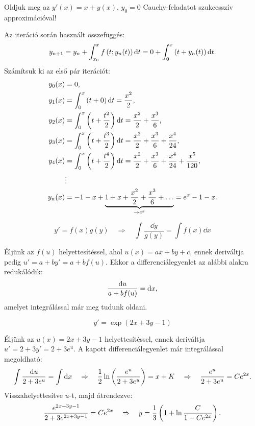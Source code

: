 \documentclass{szb-practice}
\begin{document}
\begin{example}
  Oldjuk meg az $y'(x) = x + y(x)$, $y_0 = 0$ Cauchy-feladatot szukcesszív
  approximációval!

  \boxrule

  Az iteráció során használt összefüggés:
  $$
    y_{n + 1}
    = y_n + \int_{x_0}^x f\left( t; y_{n}(t) \right) \mathop{}\!\mathrm{d} t
    = 0 + \int_0^x \left( t + y_n(t) \right) \mathop{}\!\mathrm{d} t
    \text.
  $$
  Számítsuk ki az első pár iterációt:
  \begin{align*}
    y_0(x)  & = 0 \text,
    \\
    y_1(x)  & = \int_0^x \left( t + 0 \right) \mathop{}\!\mathrm{d} t = \frac{x^2}{2} \text,
    \\
    y_2(x)  & = \int_0^x \left( t + \frac{t^2}{2} \right) \mathop{}\!\mathrm{d} t
    = \frac{x^2}{2} + \frac{x^3}{6} \text,
    \\
    y_3 (x) & = \int_0^x \left( t + \frac{t^3}{2} \right) \mathop{}\!\mathrm{d} t
    = \frac{x^2}{2} + \frac{x^3}{6} + \frac{x^4}{24} \text,
    \\
    y_4(x)  & = \int_0^x \left( t + \frac{t^4}{2} \right) \mathop{}\!\mathrm{d} t
    = \frac{x^2}{2} + \frac{x^3}{6} + \frac{x^4}{24} + \frac{x^5}{120} \text,
    \\
            & \vdots
    \\
    y_n(x)  & = -1 -x + \underbrace{1 + x + \frac{x^2}{2} + \frac{x^3}{6} + \dots}_{\to e^x}
    = e^x - 1 - x
    \text.
  \end{align*}
\end{example}

\begin{definition}
  $$
    y' = f(x)g(y)
    \quad \Rightarrow \quad
    \int \frac{\dd y}{g(y)} = \int f(x) \dd x
  $$
\end{definition}

\begin{blueBox}[$y' = f(ax + by + c)$ típusú differenciálegyenlet megoldása]
  Éljünk az $f(u)$ helyettesítéssel, ahol $u(x) = ax + by + c$, ennek deriváltja
  pedig $u' = a + b y' = a + b f(u)$. Ekkor a differenciálegyenlet az alábbi
  alakra redukálódik:
  $$
    \frac{\mathop{}\!\mathrm{d} u}{a + b f(u)} = \mathop{}\!\mathrm{d} x
    \text,
  $$
  amelyet integrálással már meg tudunk oldani.
\end{blueBox}

\begin{example}
  $$
    y' = \exp(2x + 3y - 1)
  $$
  \boxrule

  Éljünk az $u(x) = 2x + 3y - 1$ helyettesítéssel, ennek deriváltja
  $u' = 2 + 3y' = 2 + 3e^u$. A kapott differenciálegyenlet már integrálással
  megoldható:
  $$
    \int\frac{\mathop{}\!\mathrm{d} u}{2 + 3e^u} = \int\mathop{}\!\mathrm{d} x
    \quad\Rightarrow\quad
    \frac{1}{2} \ln \left( \frac{e^u}{2 + 3e^u} \right) = x + K
    \quad\Rightarrow\quad
    \frac{e^u}{2 + 3e^u} = C e^{2x}
    \text.
  $$
  Visszahelyettesítve $u$-t, majd átrendezve:
  $$
    \frac{e^{2x + 3y - 1}}{2 + 3e^{2x + 3y - 1}} = C e^{2x}
    \quad\Rightarrow\quad
    y = \frac13 \left( 1 + \ln \frac{C}{1 - Ce^{2x}} \right)
    \text.
  $$
\end{example}
\end{document}
